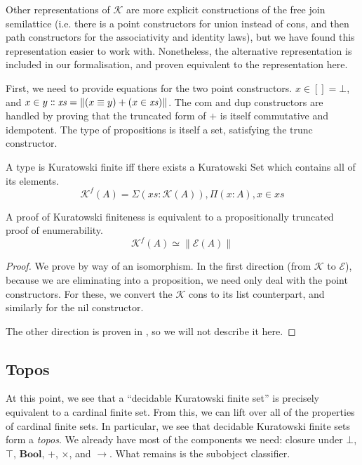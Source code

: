 Other representations of \(\mathcal{K}\) \cite{fruminFiniteSetsHomotopy2018}
are more explicit constructions of the free join semilattice (i.e. there is a
point constructors for union instead of cons, and then path constructors for
the associativity and identity laws), but we have found this representation
easier to work with.
Nonetheless, the alternative representation is included in our formalisation,
and proven equivalent to the representation here.
\begin{rm-definition}
  First, we need to provide equations for the two point constructors.
  \(x \in [] = \bot\), and \(x \in y \dblcolon \mathit{xs} = \lVert (x \equiv y)
  + (x \in \mathit{xs}) \rVert \).
  The \(\text{com}\) and \(\text{dup}\) constructors are handled by proving that
  the truncated form of \(+\) is itself commutative and idempotent.
  The type of propositions is itself a set, satisfying the \(\text{trunc}\)
  constructor.
\end{rm-definition}
\begin{rm-definition}
  A type is Kuratowski finite iff there exists a Kuratowski Set which contains
  all of its elements.
  \begin{equation}
    \mathcal{K}^{f}(A) = \Sigma {(\mathit{xs} : \mathcal{K}(A))} , \Pi (x : A) , x \in \mathit{xs}
  \end{equation}
\end{rm-definition}

\begin{rm-theorem}
  A proof of Kuratowski finiteness is equivalent to a propositionally truncated
  proof of enumerability.
  \begin{equation}
    \mathcal{K}^f(A) \simeq \lVert \mathcal{E}(A) \rVert
  \end{equation}
\end{rm-theorem}
\begin{proof}
  We prove by way of an isomorphism.
  In the first direction (from \(\mathcal{K}\) to \(\mathcal{E}\)), because we
  are eliminating into a proposition, we need only deal with the point
  constructors.
  For these, we convert the \(\mathcal{K}\) cons to its list counterpart, and
  similarly for the nil constructor.

  The other direction is proven in \cite{fruminFiniteSetsHomotopy2018}, so we
  will not describe it here.
\end{proof}
\subsection{Topos}
At this point, we see that a ``decidable Kuratowski finite set'' is precisely
equivalent to a cardinal finite set.
From this, we can lift over all of the properties of cardinal finite sets.
In particular, we see that decidable Kuratowski finite sets form a \emph{topos}.
We already have most of the components we need: closure under \(\bot\),
\(\top\), \(\mathbf{Bool}\), \(+\), \(\times\), and \(\rightarrow\).
What remains is the subobject classifier.
